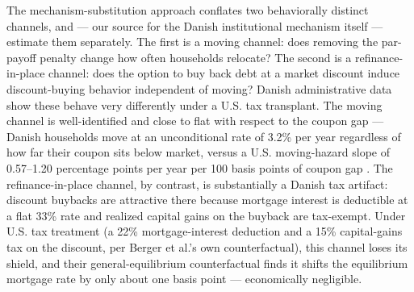 \documentclass[12pt]{article}
\begin{document}
The mechanism-substitution approach conflates two behaviorally distinct channels, and \citet{berger2026} --- our source for the Danish institutional mechanism itself --- estimate them separately. The first is a moving channel: does removing the par-payoff penalty change how often households relocate? The second is a refinance-in-place channel: does the option to buy back debt at a market discount induce discount-buying behavior independent of moving? Danish administrative data show these behave very differently under a U.S. tax transplant. The moving channel is well-identified and close to flat with respect to the coupon gap --- Danish households move at an unconditional rate of 3.2\% per year regardless of how far their coupon sits below market, versus a U.S. moving-hazard slope of 0.57--1.20 percentage points per year per 100 basis points of coupon gap \citep{fonseca2024}. The refinance-in-place channel, by contrast, is substantially a Danish tax artifact: discount buybacks are attractive there because mortgage interest is deductible at a flat 33\% rate and realized capital gains on the buyback are tax-exempt. Under U.S. tax treatment (a 22\% mortgage-interest deduction and a 15\% capital-gains tax on the discount, per Berger et al.'s own counterfactual), this channel loses its shield, and their general-equilibrium counterfactual finds it shifts the equilibrium mortgage rate by only about one basis point --- economically negligible.
\end{document}
